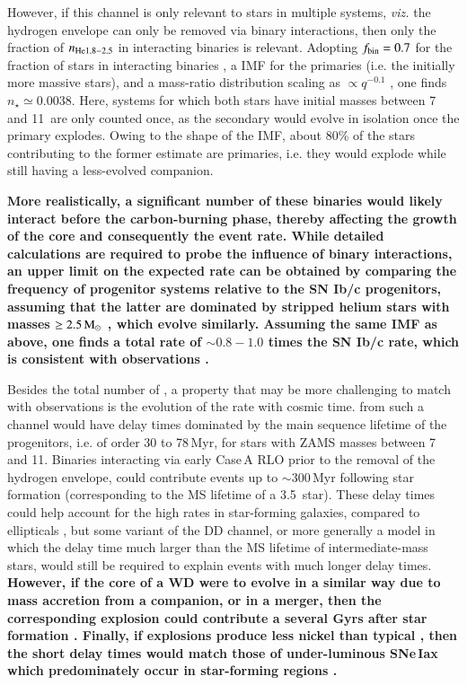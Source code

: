 \documentclass[twocolumn]{aa}
\begin{document}
However, if this channel is only relevant to stars in multiple systems, {\it viz.} the hydrogen envelope can only be removed via binary 
interactions, then only the fraction of $n_{\rm{He}1.8-2.5}$ in interacting binaries is relevant. 
Adopting $f_{\rm bin}=0.7$ for the fraction of stars in interacting binaries \citep{Sana:2012px}, a \cite{Chabrier:2004vw} IMF for the primaries (i.e. the 
initially more massive stars), and a mass-ratio distribution scaling as $\propto q^{-0.1}$ \citep{Sana:2012px}, one finds $n_\star \simeq 0.0038$. Here, systems for which both stars have initial masses between 7 and 11\msun\ are only counted once, as the secondary would evolve in isolation once the primary explodes. Owing to the shape of the IMF, about 80\% of the stars contributing to the former estimate are primaries, i.e. they would explode while still having a less-evolved companion. 

{\bf More realistically, a significant number of these binaries would likely interact before the carbon-burning phase, thereby affecting the growth of the core and consequently the event rate. While detailed  calculations are required to probe the influence  of binary interactions, an upper limit on the expected rate can be obtained by comparing  the frequency of progenitor systems  relative to  the SN Ib/c progenitors, assuming that the latter are dominated by stripped helium stars with masses $\ge 2.5\mathrm{\,M_\odot}$ \citep{Woosley:2019sdf}, which evolve similarly. Assuming the same IMF as above, one finds a total rate of $\sim 0.8-1.0$ times the SN Ib/c rate, which is consistent with observations \citep[][and references therein]{branch2017}. }


Besides the total number of \ias, a property that may be more challenging to match with observations is the evolution of the \ia rate with cosmic time. \ias from such a channel would have delay times dominated by the main sequence lifetime of the progenitors, i.e. of order 30 to 78\,Myr, for stars with ZAMS masses between 7 and 11\msun. Binaries interacting via early Case\,A RLO prior to the removal of the hydrogen envelope, could contribute events up to $\sim 300$\,Myr following star formation (corresponding to the MS lifetime of a 3.5\msun\ star). 
These delay times could help account for the high \ia rates in star-forming galaxies, compared to ellipticals \citep{Maoz:2010pz,claeys2014}, but some variant of the DD channel, or more generally a model in which the delay time much larger than the MS lifetime of intermediate-mass stars, would still be required to explain events with much longer delay times.  
{\bf However,  if the \one core of a WD  were to evolve in a similar way due to 
mass accretion from a companion, or in a merger, then the corresponding explosion could contribute a \ia several Gyrs after star formation \citep[see also][and references therein]{marquardt2015,Schwab:2015bma,Jones:2016asr,Schwab:2017epw,Schwab:2018cnb,kashyap2018,augustine2019}. 
Finally, if \one explosions produce less nickel than typical \ias, then the short delay times would match those of under-luminous SNe\,Iax which predominately occur in star-forming regions \citep{Jha:2017gwq}. }
\end{document}
